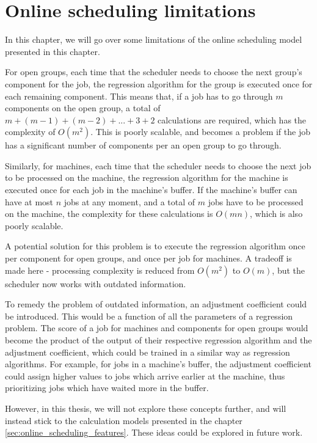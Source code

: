 \section{Online scheduling limitations}
\label{sec:online_scheduling_limitations}

In this chapter, we will go over some limitations of the online scheduling model presented in this chapter.

For open groups, each time that the scheduler needs to choose the next group's component for the job, the regression algorithm for the group is executed once for each remaining component. This means that, if a job has to go through $m$ components on the open group, a total of $m + (m - 1) + (m - 2) + ... + 3 + 2$ calculations are required, which has the complexity of $O(m^2)$. This is poorly scalable, and becomes a problem if the job has a significant number of components per an open group to go through.

Similarly, for machines, each time that the scheduler needs to choose the next job to be processed on the machine, the regression algorithm for the machine is executed once for each job in the machine's buffer. If the machine's buffer can have at most $n$ jobs at any moment, and a total of $m$ jobs have to be processed on the machine, the complexity for these calculations is $O(mn)$, which is also poorly scalable.

A potential solution for this problem is to execute the regression algorithm once per component for open groups, and once per job for machines. A tradeoff is made here - processing complexity is reduced from $O(m^2)$ to $O(m)$, but the scheduler now works with outdated information. 

To remedy the problem of outdated information, an adjustment coefficient could be introduced. This would be a function of all the parameters of a regression problem. The score of a job for machines and components for open groups would become the product of the output of their respective regression algorithm and the adjustment coefficient, which could be trained in a similar way as regression algorithms. For example, for jobs in a machine's buffer, the adjustment coefficient could assign higher values to jobs which arrive earlier at the machine, thus prioritizing jobs which have waited more in the buffer.

However, in this thesis, we will not explore these concepts further, and will instead stick to the calculation models presented in the chapter \ref{sec:online_scheduling_features}. These ideas could be explored in future work.

